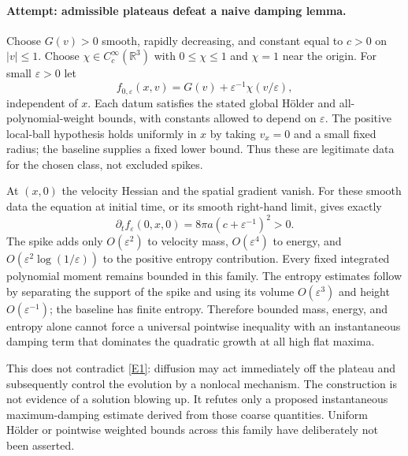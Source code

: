 \documentclass[11pt,a4paper]{article}
\newcommand{\R}{\mathbb{R}}
\newcommand{\eps}{\varepsilon}
\newcommand{\eref}[2]{\hyperlink{extra:#1:#2}{[E#2]}}
\numberwithin{equation}{section}
\begin{document}
\paragraph{Attempt: admissible plateaus defeat a naive damping lemma.}
Choose $G(v)>0$ smooth, rapidly decreasing, and constant equal to $c>0$
on $|v|\le1$. Choose $\chi\in C_c^\infty(\R^3)$ with
$0\le\chi\le1$ and $\chi=1$ near the origin. For small $\eps>0$ let
\begin{equation}\label{eq179-spike}
 f_{0,\eps}(x,v)=G(v)+\eps^{-1}\chi(v/\eps),
\end{equation}
independent of $x$. Each datum satisfies the stated global H\"older and
all-polynomial-weight bounds, with constants allowed to depend on $\eps$.
The positive local-ball hypothesis holds uniformly in $x$ by taking
$v_x=0$ and a small fixed radius; the baseline supplies a fixed lower bound.
Thus these are legitimate data for the chosen class, not excluded spikes.

At $(x,0)$ the velocity Hessian and the spatial gradient vanish. For these
smooth data the equation at initial time, or its smooth right-hand limit,
gives exactly
\begin{equation}\label{eq179-positive}
       \partial_t f_{\eps}(0,x,0)
                         =8\pi a(c+\eps^{-1})^2>0.
\end{equation}
The spike adds only $O(\eps^2)$ to velocity mass, $O(\eps^4)$ to energy,
and $O(\eps^2\log(1/\eps))$ to the positive entropy contribution.
Every fixed integrated polynomial moment remains bounded in this family.
The entropy estimates follow by separating the support of the spike and
using its volume $O(\eps^3)$ and height $O(\eps^{-1})$; the baseline has
finite entropy. Therefore bounded mass, energy, and entropy alone cannot
force a universal pointwise inequality with an instantaneous damping term
that dominates the quadratic growth at all high flat maxima.

This does not contradict \eref{179}{1}: diffusion may act immediately off
the plateau and subsequently control the evolution by a nonlocal mechanism.
The construction is not evidence of a solution blowing up. It refutes only
a proposed instantaneous maximum-damping estimate derived from those
coarse quantities. Uniform H\"older or pointwise weighted bounds across
this family have deliberately not been asserted.
\end{document}
